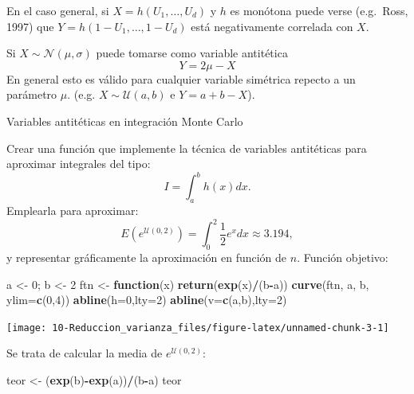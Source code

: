 \documentclass[]{book}
\newenvironment{Shaded}{\begin{snugshade}}{\end{snugshade}}
\newcommand{\KeywordTok}[1]{\textcolor[rgb]{0.13,0.29,0.53}{\textbf{#1}}}
\newcommand{\DataTypeTok}[1]{\textcolor[rgb]{0.13,0.29,0.53}{#1}}
\newcommand{\DecValTok}[1]{\textcolor[rgb]{0.00,0.00,0.81}{#1}}
\newcommand{\StringTok}[1]{\textcolor[rgb]{0.31,0.60,0.02}{#1}}
\newcommand{\ControlFlowTok}[1]{\textcolor[rgb]{0.13,0.29,0.53}{\textbf{#1}}}
\newcommand{\OperatorTok}[1]{\textcolor[rgb]{0.81,0.36,0.00}{\textbf{#1}}}
\newcommand{\NormalTok}[1]{#1}
\theoremstyle{definition}
\theoremstyle{definition}
\theoremstyle{definition}
\theoremstyle{remark}
\let\BeginKnitrBlock\begin \let\EndKnitrBlock\end
\begin{document}
En el caso general, si \(X=h\left( U_{1},\ldots,U_{d}\right)\) y \(h\)
es monótona puede verse (e.g.~Ross, 1997) que
\(Y=h\left( 1-U_{1},\ldots,1-U_{d}\right)\) está negativamente correlada
con \(X\).

Si \(X\sim \mathcal{N}(\mu,\sigma)\) puede tomarse como variable
antitética \[Y=2\mu-X\] En general esto es válido para cualquier
variable simétrica repecto a un parámetro \(\mu\). (e.g.
\(X\sim \mathcal{U}(a,b)\) e \(Y=a+b-X\)).

\BeginKnitrBlock{exercise}
\protect\hypertarget{exr:unnamed-chunk-2}{}{\label{exr:unnamed-chunk-2}
}Variables antitéticas en integración Monte Carlo
\EndKnitrBlock{exercise}

Crear una función que implemente la técnica de variables antitéticas
para aproximar integrales del
tipo:\[I=\int_{a}^{b}h\left(  x\right)  dx.\] Emplearla para aproximar:
\[E\left(  e^{\mathcal{U}(0,2)}\right)  =\int_{0}^{2}\frac{1}{2}e^{x}dx\approx3.194,\label{integralmc}\]
y representar gráficamente la aproximación en función de \(n\). Función
objetivo:

\begin{Shaded}
\begin{Highlighting}[]
\NormalTok{a <-}\StringTok{ }\DecValTok{0}\NormalTok{; b <-}\StringTok{ }\DecValTok{2}
\NormalTok{ftn <-}\StringTok{ }\ControlFlowTok{function}\NormalTok{(x) }\KeywordTok{return}\NormalTok{(}\KeywordTok{exp}\NormalTok{(x)}\OperatorTok{/}\NormalTok{(b}\OperatorTok{-}\NormalTok{a))}
\KeywordTok{curve}\NormalTok{(ftn, a, b, }\DataTypeTok{ylim=}\KeywordTok{c}\NormalTok{(}\DecValTok{0}\NormalTok{,}\DecValTok{4}\NormalTok{))}
\KeywordTok{abline}\NormalTok{(}\DataTypeTok{h=}\DecValTok{0}\NormalTok{,}\DataTypeTok{lty=}\DecValTok{2}\NormalTok{)}
\KeywordTok{abline}\NormalTok{(}\DataTypeTok{v=}\KeywordTok{c}\NormalTok{(a,b),}\DataTypeTok{lty=}\DecValTok{2}\NormalTok{)}
\end{Highlighting}
\end{Shaded}

\begin{center}\texttt{[image: 10-Reduccion\_varianza\_files/figure-latex/unnamed-chunk-3-1]} \end{center}

Se trata de calcular la media de \(e^{\mathcal{U}(0,2)}\):

\begin{Shaded}
\begin{Highlighting}[]
\NormalTok{teor <-}\StringTok{ }\NormalTok{(}\KeywordTok{exp}\NormalTok{(b)}\OperatorTok{-}\KeywordTok{exp}\NormalTok{(a))}\OperatorTok{/}\NormalTok{(b}\OperatorTok{-}\NormalTok{a)}
\NormalTok{teor}
\end{Highlighting}
\end{Shaded}
\end{document}
